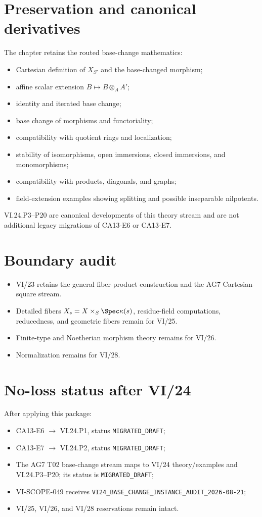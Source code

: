 \section*{Preservation and canonical derivatives}
The chapter retains the routed base-change mathematics:
\begin{itemize}
\item Cartesian definition of $X_{S'}$ and the base-changed morphism;
\item affine scalar extension $B\mapsto B\otimes_AA'$;
\item identity and iterated base change;
\item base change of morphisms and functoriality;
\item compatibility with quotient rings and localization;
\item stability of isomorphisms, open immersions, closed immersions, and monomorphisms;
\item compatibility with products, diagonals, and graphs;
\item field-extension examples showing splitting and possible inseparable nilpotents.
\end{itemize}
VI.24.P3--P20 are canonical developments of this theory stream and are not additional legacy
migrations of CA13-E6 or CA13-E7.

\section*{Boundary audit}
\begin{itemize}
\item VI/23 retains the general fiber-product construction and the AG7 Cartesian-square stream.
\item Detailed fibers $X_s=X\times_S\Spec\kappa(s)$, residue-field computations, reducedness, and
geometric fibers remain for VI/25.
\item Finite-type and Noetherian morphism theory remains for VI/26.
\item Normalization remains for VI/28.
\end{itemize}

\section*{No-loss status after VI/24}
After applying this package:
\begin{itemize}
\item CA13-E6 $\to$ VI.24.P1, status \texttt{MIGRATED\_DRAFT};
\item CA13-E7 $\to$ VI.24.P2, status \texttt{MIGRATED\_DRAFT};
\item The AG7 T02 base-change stream maps to VI/24 theory/examples and VI.24.P3--P20;
its status is \texttt{MIGRATED\_DRAFT};
\item VI-SCOPE-049 receives \texttt{VI24\_BASE\_CHANGE\_INSTANCE\_AUDIT\_2026-08-21};
\item VI/25, VI/26, and VI/28 reservations remain intact.
\end{itemize}
